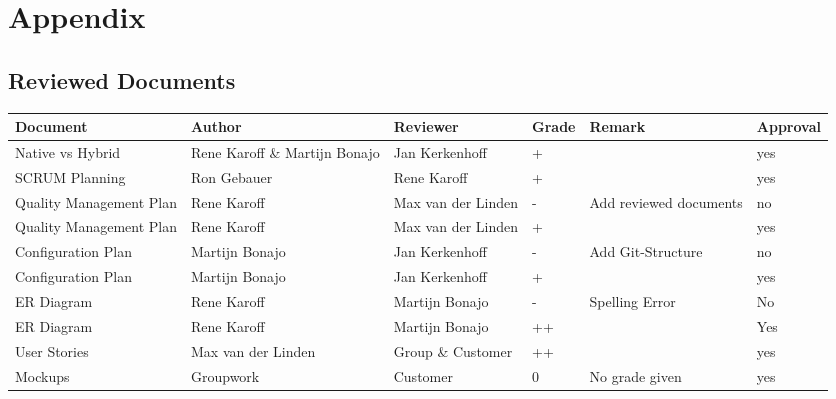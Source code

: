 \begin{sidewaystable}
	\section*{Appendix}
	\subsection*{Reviewed Documents}
		\begin{longtable}[htbp]{ l p{3.7cm} *{2}{l} p{3.7cm} l}
			\textbf{Document} & \textbf{Author} & \textbf{Reviewer} & \textbf{Grade} & \textbf{Remark} & \textbf{Approval}\\ \hline
			Native vs Hybrid & Rene Karoff \& Martijn Bonajo & Jan Kerkenhoff &+& & yes\\
			SCRUM Planning & Ron Gebauer & Rene Karoff & + & & yes \\
			Quality Management Plan & Rene Karoff & Max van der Linden &-&  Add reviewed documents& no \\
			Quality Management Plan & Rene Karoff & Max van der Linden &+& & yes \\
			Configuration Plan & Martijn Bonajo & Jan Kerkenhoff &-& Add Git-Structure & no\\
			Configuration Plan & Martijn Bonajo & Jan Kerkenhoff &+&  & yes\\
			ER Diagram & Rene Karoff & Martijn Bonajo & - & Spelling Error& No\\
			ER Diagram & Rene Karoff & Martijn Bonajo &++&& Yes\\
			User Stories & Max van der Linden & Group \& Customer & ++ & & yes \\
			Mockups & Groupwork & Customer & 0 & No grade given &  yes\\
		\end{longtable}
\end{sidewaystable}